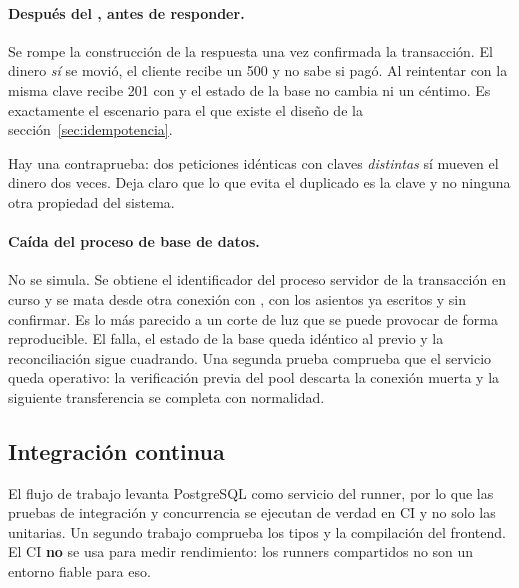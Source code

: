 \paragraph{Después del , antes de responder.} Se rompe la
construcción de la respuesta una vez confirmada la transacción. El dinero
\emph{sí} se movió, el cliente recibe un 500 y no sabe si pagó. Al reintentar
con la misma clave recibe 201 con  y el estado
de la base no cambia ni un céntimo. Es exactamente el escenario para el que
existe el diseño de la sección~\ref{sec:idempotencia}.

Hay una contraprueba: dos peticiones idénticas con claves \emph{distintas} sí
mueven el dinero dos veces. Deja claro que lo que evita el duplicado es la
clave y no ninguna otra propiedad del sistema.

\paragraph{Caída del proceso de base de datos.} No se simula. Se obtiene el
identificador del proceso servidor de la transacción en curso y se mata desde
otra conexión con , con los asientos ya
escritos y sin confirmar. Es lo más parecido a un corte de luz que se puede
provocar de forma reproducible. El  falla, el estado de la base
queda idéntico al previo y la reconciliación sigue cuadrando. Una segunda
prueba comprueba que el servicio queda operativo: la verificación previa del
pool descarta la conexión muerta y la siguiente transferencia se completa con
normalidad. 

\subsection{Integración continua}

El flujo de trabajo levanta PostgreSQL como servicio del runner, por lo que
las pruebas de integración y concurrencia se ejecutan de verdad en CI y no
solo las unitarias. Un segundo trabajo comprueba los tipos y la compilación
del frontend. El CI \textbf{no} se usa para medir rendimiento: los runners
compartidos no son un entorno fiable para eso.
